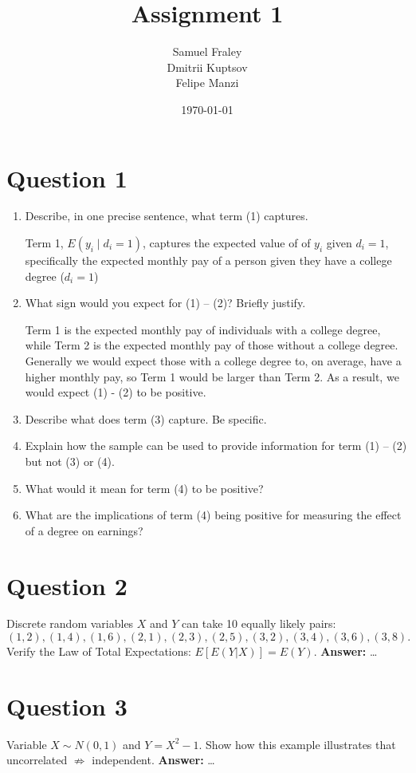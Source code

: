 \documentclass[12pt,a4paper]{article}
\title{Assignment 1}
\author{
  Samuel Fraley \\
  Dmitrii Kuptsov \\
  Felipe Manzi
}
\date{\today}
\begin{document}
\maketitle
\tableofcontents
\newpage

\section*{Question 1}
\begin{enumerate}[label=(\alph*)]
  \item Describe, in one precise sentence, what term (1) captures.

  Term 1, $E(y_{i} \mid d_i = 1)$, captures the expected value of of $y_{i}$ given $d_{i} = 1$, specifically the expected monthly pay of a person given they have a college degree ($d_{i} = 1$)

  \item What sign would you expect for (1) – (2)? Briefly justify.

  Term 1 is the expected monthly pay of individuals with a college degree, while Term 2 is the expected monthly pay of those without a college degree. Generally we would expect those with a college degree to, on average, have a higher monthly pay, so Term 1 would be larger than Term 2. As a result, we would expect (1) - (2) to be positive.
  
  \item Describe what does term (3) capture. Be specific.
  
  \item Explain how the sample can be used to provide information for term (1) – (2) but not (3) or (4).
  
  \item What would it mean for term (4) to be positive?
  
  \item What are the implications of term (4) being positive for measuring the effect of a degree on earnings?
\end{enumerate}

\section*{Question 2}
Discrete random variables $X$ and $Y$ can take 10 equally likely pairs:
\[
(1, 2), (1, 4), (1, 6), (2, 1), (2, 3), (2, 5), (3, 2), (3, 4), (3, 6), (3, 8).
\]
Verify the Law of Total Expectations: $E[E(Y|X)] = E(Y)$.  
\textbf{Answer:} \ldots

\section*{Question 3}
Variable $X \sim N(0,1)$ and $Y = X^2 - 1$. Show how this example illustrates that uncorrelated $\not\Rightarrow$ independent.  
\textbf{Answer:} \ldots
\end{document}
